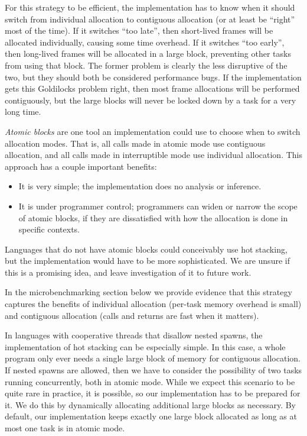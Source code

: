 \documentclass[acmsmall,anonymous,review]{acmart}\settopmatter{printfolios=true,printccs=false,printacmref=false}
\begin{document}
For this strategy to be efficient, the implementation has to know when it should switch from individual allocation to contiguous allocation (or at least be ``right'' most of the time).
If it switches ``too late'', then short-lived frames will be allocated individually, causing some time overhead.
If it switches ``too early'', then long-lived frames will be allocated in a large block, preventing other tasks from using that block.
The former problem is clearly the less disruptive of the two, but they should both be considered performance bugs.
If the implementation gets this Goldilocks problem right, then most frame allocations will be performed contiguously, but the large blocks will never be locked down by a task for a very long time.

\emph{Atomic blocks} are one tool an implementation could use to choose when to switch allocation modes.
That is, all calls made in atomic mode use contiguous allocation, and all calls made in interruptible mode use individual allocation.
This approach has a couple important benefits:
\begin{itemize}
\item It is very simple; the implementation does no analysis or inference.
\item It is under programmer control; programmers can widen or narrow the scope of atomic blocks, if they are dissatisfied with how the allocation is done in specific contexts.
\end{itemize}

Languages that do not have atomic blocks could conceivably use hot stacking, but the implementation would have to be more sophisticated.
We are unsure if this is a promising idea, and leave investigation of it to future work.

In the microbenchmarking section below we provide evidence that this strategy captures the benefits of individual allocation (per-task memory overhead is small) and contiguous allocation (calls and returns are fast when it matters).

In languages with cooperative threads that disallow nested spawns, the implementation of hot stacking can be especially simple.
In this case, a whole program only ever needs a single large block of memory for contiguous allocation.
If nested spawns are allowed, then we have to consider the possibility of two tasks running concurrently, both in atomic mode.
While we expect this scenario to be quite rare in practice, it is possible, so our implementation has to be prepared for it.
We do this by dynamically allocating additional large blocks as necessary.
By default, our implementation keeps exactly one large block allocated as long as at most one task is in atomic mode.
\end{document}
